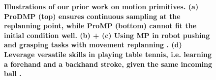 \begin{figure}[t]
\begin{subfigure}{0.325\textwidth}
{        }
        \caption{}        
        \label{subfig:mp_tt}
    \end{subfigure}            
    \caption{\textbf{\small Illustrations of our prior work on motion primitives. (a) ProDMP (top) \cite{li2023prodmp} ensures continuous sampling at the replanning point, while ProMP (bottom) \cite{paraschos2013probabilistic} cannot fit the initial condition well. (b) + (c) Using MP in robot pushing and grasping tasks with movement replanning \cite{li2023prodmp, otto2023mp3}. (d) Leverage versatile skills in playing table tennis, i.e. learning a forehand and a backhand stroke, given the same incoming ball \cite{celik2022specializing,blessing2023information}.}}
    \label{fig:obj3}
\end{figure}



